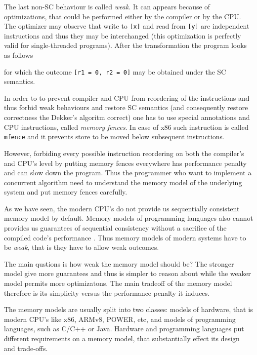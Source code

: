 \documentclass[a4paper,twoside,11pt]{article}
\numberwithin{equation}{section}
\begin{document}
The last non-SC behaviour is called \emph{weak}.
It can appears because of optimizations,
that could be performed either by the compiler or by the CPU. 
The optimizer may observe that write to \texttt{[x]} and read from \texttt{[y]}
are independent instructions and thus they may be interchanged
(this optimization is perfectly valid for single-threaded programs).
After the transformation the program looks as follows


for which the outcome \texttt{[r1 = 0, r2 = 0]} may be obtained under the SC semantics.

In order to to prevent compiler and CPU from reordering of the instructions 
and thus forbid weak behaviours and restore SC semantics
(and consequently restore correctness the Dekker's algoritm correct)
one has to use special annotations and CPU instructions, called \emph{memory fences}.
In case of x86 such instruction is called \texttt{mfence} and it prevents 
store to be moved below subsequent instructions.  

However, forbiding every possible instruction reordering  
on both the compiler's and CPU's level by putting memory fences everywhere
has performance penalty and can slow down the program.
Thus the programmer who want to implement a concurrent algorithm 
need to understand the memory model of the underlying system 
and put memory fences carefully.  

As we have seen, the modern CPU's do not provide us sequentially consistent memory model by default. 
Memory models of programming languages also cannot provides us guarantees of sequential consistency
without a sacrifice of the compiled code's performance .  
Thus memory models of modern systems have to be \emph{weak}, that is they have to allow weak outcomes.  

The main qustions is how weak the memory model should be?
The stronger model give more guarantees and thus is simpler to reason about while the weaker model permits more optimizatons. 
The main tradeoff of the memory model therefore is its simplicity versus the performance penalty it induces. 

The memory models are usually split into two classes: 
models of hardware, that is modern CPU's like x86, ARMv8, POWER, etc, 
and models of programming languages, such as C/C++ or Java. 
Hardware and programming languages put different requirements 
on a memory model, that substantially effect its design and trade-offs.     
\end{document}
